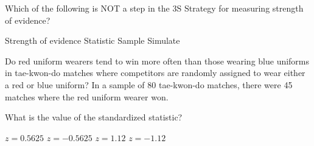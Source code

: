 \documentclass{exam}
\begin{document}
\begin{questions}
		\question Which of the following is NOT a step in the 3S Strategy for measuring strength of evidence?
		
		\begin{oneparchoices}
			\choice Strength of evidence
			\choice Statistic
			\correctchoice Sample
			\choice Simulate
		\end{oneparchoices}
		
		\question Do red uniform wearers tend to win more often than those wearing blue uniforms in tae-kwon-do matches where competitors are randomly assigned to wear either a red or blue uniform? In a sample of 80 tae-kwon-do matches, there were 45 matches where the red uniform wearer won.
		
		What is the value of the standardized statistic?
		
		\begin{choices}
			\choice \(z = 0.5625\)
			\choice \(z = -0.5625\)
			\correctchoice \(z = 1.12\)
			\choice \(z = -1.12\)
		\end{choices}
		
	\end{questions}
\end{document}
